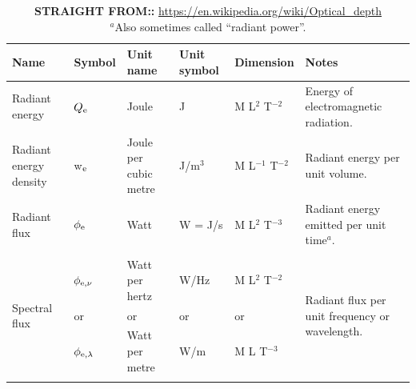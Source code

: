 \documentclass[11pt,a4paper]{article}
\begin{document}
\clearpage
\begin{landscape} 
\begin{table}
  \begin{center}
    \setlength{\tabcolsep}{4pt}
    \begin{tabular}{  p{45mm}   p{20mm}  p{40mm}  p{20mm}   p{20mm}  p{90mm}} 
      \hline
      \hline
      Name	                                      & Symbol                       & Unit name                     & Unit symbol  & Dimension                 & Notes   \\
      \hline
      Radiant energy	                      &  $Q_{\rm e}$                 & Joule                              &	J             & M L$^{2}$    T$^{-2}$     & Energy of electromagnetic radiation. \\
      Radiant energy density            & w$_{\rm e}$	             & Joule per cubic metre    & J/m$^3$	      & M L$^{-1}$  T$^{-2}$     & Radiant energy per unit volume. \\
      Radiant flux                             & $\phi_{\rm e}$              & Watt	                              & W = J/s         & M L$^{2}$    T$^{-3}$    & Radiant energy emitted per unit time$^{a}$. \\
                                                      &&&&& \\
      \multirow{3}{*}{Spectral flux}  &  $\phi_{{\rm e}, \nu}$       & Watt per hertz                & W/Hz            & M L$^{2}$    T$^{−2}$    & \multirow{3}{*}{Radiant flux per unit frequency or wavelength.}  \\
                                                     &  or                                & or                                   & or                 & or                                & \\
                                                     & $\phi_{{\rm e}, \lambda}$  & Watt per metre                 & W/m            & M L             T$^{-3}$   & \\
                                                      &&&&& \\
      \hline
      \hline
    \end{tabular}
    \caption{{\bf STRAIGHT FROM::} 
      \href{https://en.wikipedia.org/wiki/Optical\_depth}{https://en.wikipedia.org/wiki/Optical\_depth}\\
      $^{a}$Also sometimes called ``radiant power''.
    }
     \label{tab:units_overview}
  \end{center}
\end{table}
\end{landscape} 
\end{document}
